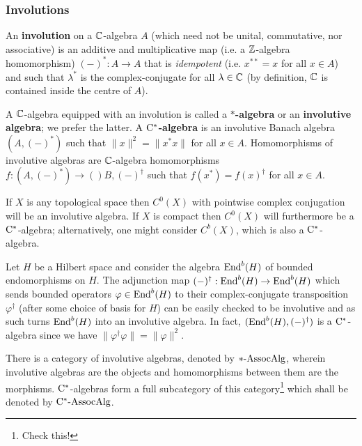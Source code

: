         \subsubsection{Involutions}
            \begin{definition} \label{def: involutions}
                An \textbf{involution} on a $\mathbb{C}$-algebra $A$ (which need not be unital, commutative, nor associative) is an additive and multiplicative map (i.e. a $\mathbb{Z}$-algebra homomorphism) $(-)^*: A \to A$ that is \textit{idempotent} (i.e. $x^{**} = x$ for all $x \in A$) and such that $\lambda^*$ is the complex-conjugate for all $\lambda \in \mathbb{C}$ (by definition, $\mathbb{C}$ is contained inside the centre of $A$).
                
                A $\mathbb{C}$-algebra equipped with an involution is called a \textbf{$*$-algebra} or an \textbf{involutive algebra}; we prefer the latter. A \textbf{$\mathrm{C}^*$-algebra} is an involutive Banach algebra $(A, (-)^*)$ such that $\|x\|^2 = \|x^* x\|$ for all $x \in A$. Homomorphisms of involutive algebras are $\mathbb{C}$-algebra homomorphisms $f: (A, (-)^*) \to ()B, (-)^{\dagger}$ such that $f(x^*) = f(x)^{\dagger}$ for all $x \in A$. 
            \end{definition}
            \begin{example}
                If $X$ is any topological space then $C^0(X)$ with pointwise complex conjugation will be an involutive algebra. If $X$ is compact then $C^0(X)$ will furthermore be a $\mathrm{C}^*$-algebra; alternatively, one might consider $C^b(X)$, which is also a $\mathrm{C}^*$-algebra.
            \end{example}
            \begin{example}
                Let $H$ be a Hilbert space and consider the algebra $\mathrm{End}^b(H)$ of bounded endomorphisms on $H$. The adjunction map $(-)^{\dagger}: \mathrm{End}^b(H) \to \mathrm{End}^b(H)$ which sends bounded operators $\varphi \in \mathrm{End}^b(H)$ to their complex-conjugate transposition $\varphi^{\dagger}$ (after some choice of basis for $H$) can be easily checked to be involutive and as such turns $\mathrm{End}^b(H)$ into an involutive algebra. In fact, $(\mathrm{End}^b(H), (-)^{\dagger})$ is a $\mathrm{C}^*$-algebra since we have $\|\varphi^{\dagger} \varphi\| = \|\varphi\|^2$.
            \end{example}
            \begin{convention}
                There is a category of involutive algebras, denoted by $*\text{-}\mathrm{Assoc}\mathrm{Alg}$, wherein involutive algebras are the objects and homomorphisms between them are the morphisms. $\mathrm{C}^*$-algebras form a full subcategory of this category\footnote{Check this!} which shall be denoted by $\mathrm{C}^*\text{-}\mathrm{Assoc}\mathrm{Alg}$. 
            \end{convention}
            
